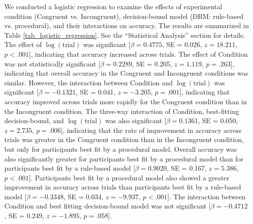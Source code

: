 \documentclass[doc, floatsintext]{apa7}
\begin{document}
We conducted a logistic regression to examine the effects of experimental condition (Congruent vs.  Incongruent),
decision-bound model (DBM: rule-based vs.  procedural), and their interactions on accuracy.  The results are summarized
in Table \ref{tab_logistic_regression}.  See the ``Statistical Analysis'' section for details. 
%
The effect of $\log(\text{trial})$ was significant [$\beta =
0.4775$, SE = 0.026, $z = 18.211$, $p < .001$], indicating
that accuracy increased across trials.  
%
The effect of Condition was not statistically significant [$\beta = 0.2289$, SE = 0.205, $z = 1.119$, $p = .263$], indicating that overall accuracy in the Congruent and Incongruent conditions was similar. 
%
However, the interaction between Condition and $\log(\text{trial})$ was significant [$\beta = -0.1321$, SE = 0.041, $z = -3.205$, $p = .001$], indicating that accuracy improved across trials more rapidly for the Congruent condition than in the Incongruent condition.
%
The three-way interaction of Condition, best-fitting decision-bound, and $\log(\text{trial})$ was also
significant [$\beta = 0.1361$, SE = 0.050, $z = 2.735$, $p = .006$], indicating that the rate of improvement in accuracy
across trials was greater in the Congruent condition than in the Incongruent condition, but only for participants best fit by a procedural model.
%
Overall accuracy was also significantly greater for
participants best fit by a procedural model than for
participants best fit by a rule-based model [$\beta =
0.9020$, SE = 0.167, $z = 5.386$, $p < .001$].
%
Participants best fit by a procedural model also showed a
greater improvement in accuracy across trials than
participants best fit by a rule-based model [$\beta =
-0.3348$, SE = 0.034, $z = -9.937$, $p < .001$].
%
The interaction between Condition and best fitting
decision-bound model was not significant [$\beta = -0.4712$,
SE = 0.249, $z = -1.895$, $p = .058$].
\end{document}
